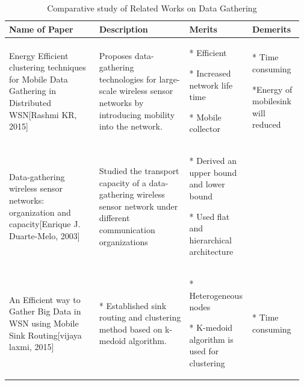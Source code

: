 \documentclass[MTech]{iitmdiss}
\begin{document}
\begin{table}[h]
\centering
\caption{\label{table2} Comparative study of Related Works on Data Gathering}
{
\scriptsize\addtolength{\tabcolsep}{-5pt}
\hfill{}
\begin{tabular}{|p{0.3\linewidth}|p{0.3\linewidth}|p{0.2\linewidth}|p{0.17\linewidth}|}
  \hline
 \textbf{Name of Paper } & \textbf{Description} &\textbf{Merits} & \textbf{Demerits} \\ 
\hline  
\vspace{5mm}
Energy Efficient clustering techniques for Mobile Data Gathering in Distributed WSN[Rashmi KR, 2015]	
&\vspace{5mm}Proposes data-gathering technologies for large-scale  wireless sensor networks by introducing mobility into the network. &\vspace{0.7mm}
* Efficient

* Increased network life time

* Mobile collector 
&\vspace{0.7mm}
* Time consuming


*Energy of mobilesink will reduced 
 \\
\hline
\vspace{5mm}
Data-gathering wireless sensor networks: organization
and capacity[Enrique J. Duarte-Melo, 2003]		
&\vspace{5mm}Studied  the transport capacity of a data-gathering wireless sensor network under different communication organizations &\vspace{0.7mm}
* Derived an upper bound  and lower bound 

* Used flat and hierarchical  architecture 
&\\
\hline
\vspace{5mm}
An Efficient way to Gather Big Data in WSN 
using Mobile Sink Routing[vijaya laxmi, 2015]	
&\vspace{5mm}
* Established  sink routing and clustering method based on k-medoid 
algorithm. &\vspace{0.7mm}
* Heterogeneous nodes 

* K-medoid algorithm is used for clustering	
&\vspace{0.7mm}
* Time consuming
\\

\hline
\end{tabular}}
\hfill{}
\end{table}
\pagebreak
\end{document}
